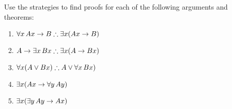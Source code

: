 \problempart
Use the strategies to find proofs for each of the following arguments and theorems:
\begin{enumerate}
\item $\forall x\,\atom{A}{x} \eif B \therefore \exists x(\atom{A}{x} \eif B)$
\item $A \eif \exists x\, \atom{B}{x} \therefore \exists x(A \eif \atom{B}{x})$
\item $\forall x(A \eor \atom{B}{x}) \therefore A \eor \forall x\,\atom{B}{x})$
\item $\exists x(\mathord{A}x \rightarrow \forall y\,\mathord{A}y)$
\item $\exists x(\exists y\,\mathord{A}y \rightarrow \mathord{A}x)$
\end{enumerate}
